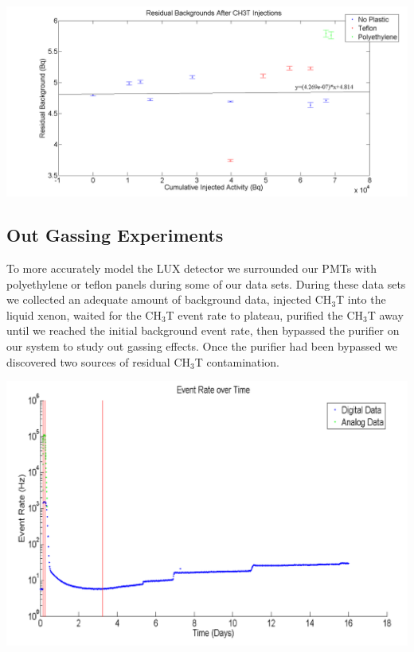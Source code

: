 \documentclass[a4paper,12pt]{article}
\begin{document}
\begin{center}
\includegraphics[scale=0.35]{ResidualBackgrounds.png}
\end{center}

\subsection{Out Gassing Experiments}

To more accurately model the LUX detector we surrounded our PMTs with polyethylene or teflon panels during some of our data sets.  During these data sets we collected an adequate amount of background data, injected CH$_3$T into the liquid xenon, waited for the CH$_3$T event rate to plateau, purified the CH$_3$T away until we reached the initial background event rate, then bypassed the purifier on our system to study out gassing effects.  Once the purifier had been bypassed we discovered two sources of residual CH$_3$T contamination.  

\begin{center}
\includegraphics[scale=0.5]{Outgassing_TimeHisto_Log.png}
\end{center}
\end{document}
